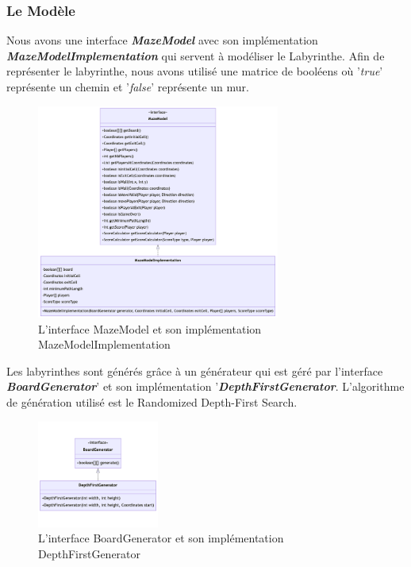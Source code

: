\subsubsection{Le Modèle}
\label{subsubsec:modele}

Nous avons une interface \textbf{\textit{MazeModel}} avec son implémentation
\textbf{\textit{MazeModelImplementation}} qui servent à modéliser le
Labyrinthe. Afin de représenter le labyrinthe, nous avons utilisé une matrice
de booléens où '\textit{true}' représente un chemin et '\textit{false}'
représente un mur.

\begin{figure}[H]
    \centering
    \includegraphics[width=8cm]{ressources/Implementation/Labyrinthe/Modele/MazeModelAndImplementation.png}
    \caption{L'interface MazeModel et son implémentation MazeModelImplementation}
    \label{fig:MazeModelAndImplementation}
\end{figure}

Les labyrinthes sont générés grâce à un générateur qui est géré par l'interface
\textbf{\textit{BoardGenerator}}' et son implémentation
'\textbf{\textit{DepthFirstGenerator}}. L'algorithme de génération utilisé est
le Randomized Depth-First Search.

\begin{figure}[H]
    \centering
    \includegraphics[width=4cm]{ressources/Implementation/Labyrinthe/Modele/DepthFirstGenerator.png}
    \caption{L'interface BoardGenerator et son implémentation DepthFirstGenerator}
    \label{fig:BoardGeneratorAndDepthFirstGenerator}
\end{figure}

